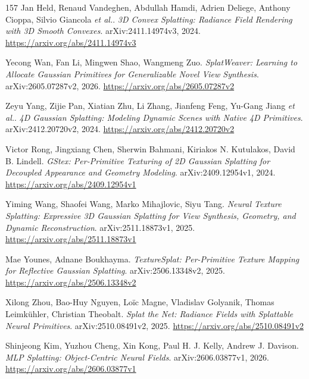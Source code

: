 \documentclass[11pt,a4paper]{article}
\begin{document}
\begin{thebibliography}{157}
Jan Held, Renaud Vandeghen, Abdullah Hamdi, Adrien Deliege, Anthony Cioppa, Silvio Giancola \emph{et al.}.
\newblock \emph{3D Convex Splatting: Radiance Field Rendering with 3D Smooth Convexes}.
\newblock arXiv:2411.14974v3, 2024.
\newblock \url{https://arxiv.org/abs/2411.14974v3}

Yecong Wan, Fan Li, Mingwen Shao, Wangmeng Zuo.
\newblock \emph{SplatWeaver: Learning to Allocate Gaussian Primitives for Generalizable Novel View Synthesis}.
\newblock arXiv:2605.07287v2, 2026.
\newblock \url{https://arxiv.org/abs/2605.07287v2}

Zeyu Yang, Zijie Pan, Xiatian Zhu, Li Zhang, Jianfeng Feng, Yu-Gang Jiang \emph{et al.}.
\newblock \emph{4D Gaussian Splatting: Modeling Dynamic Scenes with Native 4D Primitives}.
\newblock arXiv:2412.20720v2, 2024.
\newblock \url{https://arxiv.org/abs/2412.20720v2}

Victor Rong, Jingxiang Chen, Sherwin Bahmani, Kiriakos N. Kutulakos, David B. Lindell.
\newblock \emph{GStex: Per-Primitive Texturing of 2D Gaussian Splatting for Decoupled Appearance and Geometry Modeling}.
\newblock arXiv:2409.12954v1, 2024.
\newblock \url{https://arxiv.org/abs/2409.12954v1}

Yiming Wang, Shaofei Wang, Marko Mihajlovic, Siyu Tang.
\newblock \emph{Neural Texture Splatting: Expressive 3D Gaussian Splatting for View Synthesis, Geometry, and Dynamic Reconstruction}.
\newblock arXiv:2511.18873v1, 2025.
\newblock \url{https://arxiv.org/abs/2511.18873v1}

Mae Younes, Adnane Boukhayma.
\newblock \emph{TextureSplat: Per-Primitive Texture Mapping for Reflective Gaussian Splatting}.
\newblock arXiv:2506.13348v2, 2025.
\newblock \url{https://arxiv.org/abs/2506.13348v2}

Xilong Zhou, Bao-Huy Nguyen, Lo\"{i}c Magne, Vladislav Golyanik, Thomas Leimk\"{u}hler, Christian Theobalt.
\newblock \emph{Splat the Net: Radiance Fields with Splattable Neural Primitives}.
\newblock arXiv:2510.08491v2, 2025.
\newblock \url{https://arxiv.org/abs/2510.08491v2}

Shinjeong Kim, Yuzhou Cheng, Xin Kong, Paul H. J. Kelly, Andrew J. Davison.
\newblock \emph{MLP Splatting: Object-Centric Neural Fields}.
\newblock arXiv:2606.03877v1, 2026.
\newblock \url{https://arxiv.org/abs/2606.03877v1}


\end{thebibliography}
\end{document}
